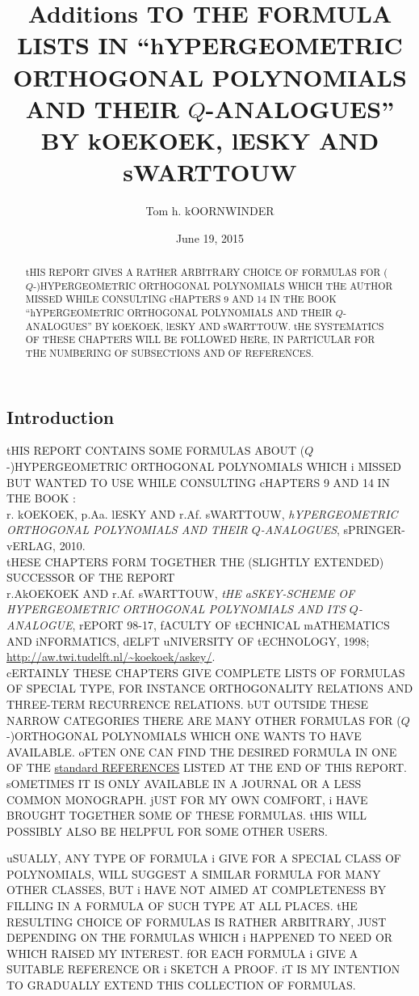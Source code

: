 \documentclass[twoside,11pt]{article}
\newcommand\sa{\smallskipamount}
\newcommand\sLP{\\[\sa]}
\newcommand\sPP{\\[\sa]\indent}
\begin{document}
 
 
\title{Additions TO THE FORMULA LISTS IN 
``hYPERGEOMETRIC ORTHOGONAL POLYNOMIALS AND THEIR $Q$-ANALOGUES'' 
BY kOEKOEK, lESKY AND sWARTTOUW} 
\author{Tom h. kOORNWINDER} 
\date{June 19, 2015} 
\maketitle 
\begin{abstract} 
tHIS REPORT GIVES A RATHER ARBITRARY CHOICE OF FORMULAS FOR 
($Q$-)HYPERGEOMETRIC ORTHOGONAL POLYNOMIALS WHICH THE AUTHOR MISSED 
WHILE CONSULTING cHAPTERS 9 AND 14 IN THE BOOK 
``hYPERGEOMETRIC ORTHOGONAL POLYNOMIALS AND THEIR $Q$-ANALOGUES'' 
BY kOEKOEK, lESKY AND sWARTTOUW. tHE SYSTEMATICS OF THESE CHAPTERS WILL BE FOLLOWED 
HERE, IN PARTICULAR FOR THE NUMBERING OF SUBSECTIONS AND OF REFERENCES. 
\end{abstract} 
% 
\subsection*{Introduction} 
\label{sec_intro} 
tHIS REPORT CONTAINS SOME FORMULAS ABOUT ($Q$-)HYPERGEOMETRIC 
ORTHOGONAL POLYNOMIALS WHICH i MISSED BUT WANTED TO USE 
WHILE CONSULTING cHAPTERS 9 AND 14 IN THE BOOK : 
\sLP 
r. kOEKOEK, p.Aa. lESKY AND r.Af. sWARTTOUW, 
{\em hYPERGEOMETRIC ORTHOGONAL POLYNOMIALS AND THEIR $Q$-ANALOGUES}, 
sPRINGER-vERLAG, 2010. 
\sLP 
tHESE CHAPTERS FORM TOGETHER THE (SLIGHTLY EXTENDED) SUCCESSOR OF THE REPORT 
\sLP 
r.AkOEKOEK AND  r.Af. sWARTTOUW, 
{\em tHE aSKEY-SCHEME OF HYPERGEOMETRIC ORTHOGONAL 
POLYNOMIALS AND ITS $Q$-ANALOGUE}, 
rEPORT 98-17, fACULTY OF tECHNICAL mATHEMATICS AND iNFORMATICS, 
dELFT uNIVERSITY OF tECHNOLOGY, 1998; 
\url{http://aw.twi.tudelft.nl/~koekoek/askey/}. 
\sPP 
cERTAINLY THESE CHAPTERS GIVE COMPLETE LISTS OF FORMULAS OF SPECIAL TYPE, FOR INSTANCE 
ORTHOGONALITY RELATIONS AND THREE-TERM RECURRENCE RELATIONS. bUT OUTSIDE THESE NARROW 
CATEGORIES THERE ARE MANY OTHER 
FORMULAS FOR ($Q$-)ORTHOGONAL POLYNOMIALS WHICH ONE WANTS TO HAVE AVAILABLE. 
oFTEN ONE CAN FIND THE DESIRED FORMULA IN ONE OF THE 
\hyperref[sec_ref1]{standard REFERENCES} LISTED AT THE END OF THIS REPORT. 
sOMETIMES IT IS ONLY AVAILABLE IN A JOURNAL OR A LESS COMMON MONOGRAPH. 
jUST FOR MY OWN COMFORT, i HAVE BROUGHT TOGETHER SOME OF THESE FORMULAS. 
tHIS WILL POSSIBLY ALSO BE HELPFUL FOR SOME OTHER USERS. 
 
uSUALLY, ANY TYPE OF FORMULA i GIVE FOR A SPECIAL CLASS OF POLYNOMIALS, WILL SUGGEST 
A SIMILAR FORMULA FOR MANY OTHER CLASSES, BUT i HAVE NOT AIMED AT COMPLETENESS 
BY FILLING IN A FORMULA OF SUCH TYPE AT ALL PLACES. tHE RESULTING CHOICE OF FORMULAS IS 
RATHER ARBITRARY, JUST DEPENDING ON THE FORMULAS WHICH i HAPPENED TO NEED OR WHICH RAISED MY INTEREST. 
fOR EACH FORMULA i GIVE  A SUITABLE REFERENCE OR i SKETCH A 
PROOF. 
iT IS MY INTENTION TO GRADUALLY EXTEND THIS COLLECTION OF FORMULAS. 
% 
\end{document}
